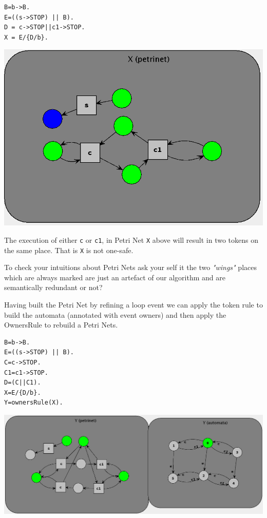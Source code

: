 \documentclass[]{article}
\begin{document}
\begin{minipage}{0.25\textwidth}
\begin{verbatim}
B=b->B.
E=((s->STOP) || B). 
D = c->STOP||c1->STOP.
X = E/{D/b}.
  \end{verbatim}
\end{minipage}\begin{minipage}{0.7\textwidth}
\begin{center}
\includegraphics[scale=0.4]{Xwings.png}\end{center}
\end{minipage}

The execution of either \verb|c| or \verb|c1|, in Petri Net \verb|X| above will result in two tokens on the same place. That is \verb|X| is not one-safe.

To check your intuitions about Petri Nets ask your self it the two \emph{"wings"} places which are always marked are just an artefact of our algorithm and are semantically redundant or not?


Having built the Petri Net by refining a loop event we can apply the token rule to build the automata (annotated with event owners) and then apply the OwnersRule to rebuild a Petri Nets.
\begin{minipage}{0.25\textwidth}
\begin{verbatim}
B=b->B.
E=((s->STOP) || B). 
C=c->STOP.
C1=c1->STOP.
D=(C||C1).
X=E/{D/b}.
Y=ownersRule(X).
  \end{verbatim}
\end{minipage}\begin{minipage}{0.7\textwidth}
\begin{center}\includegraphics[scale=0.4]{Ywings.png}\end{center}
\end{minipage}
\end{document}
